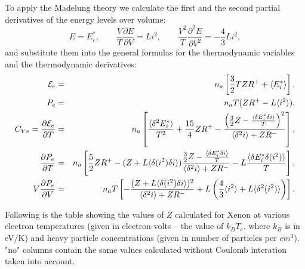 To apply the Madelung theory we calculate the first and the second partial derivatives
of the energy levels over volume:
\begin{equation}
E = E^*_i, \qquad
\frac{V}{T} \frac{\partial E}{\partial V} = L i^2, \qquad
\frac{V^2}{T} \frac{\partial^2 E}{\partial V^2} = -\frac43 L i^2,
\end{equation}
and substitute them into the general formulas for the thermodynamic variables
and the thermodynamic derivatives:
\begin{eqnarray}
\label{madE}
{\cal E}_e &=& n_a\left[ \frac32 T Z R^+ + \langle E^*_i \rangle \right], \\
\label{madP}
P_e &=& n_aT ( ZR^+ - L \langle i^2 \rangle ), \\
\label{madCv}
C_{Ve} = \frac{\partial {\cal E}_e}{\partial T} &=& n_a\left[\frac{\langle\delta^2E^*_i\rangle}{T^2}+\frac{15}4ZR^+
-\frac{\left(\frac32Z-\frac{\langle\delta E^*_i\delta i\rangle}T\right)^2}{\langle\delta^2i\rangle+ZR^-}\right], \\
\label{madPT}
\frac {\partial P_e}{\partial T} &=&
n_a\left[
	\frac52 Z R^+ -
	(Z+L \langle \delta(i^2) \delta i \rangle)
		\frac{\frac32Z-\frac{\langle\delta E^*_i\delta i\rangle}T}{\langle\delta^2i\rangle+ZR^-} -
	L \frac{\langle \delta E^*_i \delta(i^2) \rangle}T
\right], \\
\label{madCompr}
V\frac{\partial P_e}{\partial V} &=&
n_a T \left[ -\frac{(Z + L \langle \delta(i^2) \delta i \rangle)^2}{\langle \delta^2 i \rangle + ZR^-} +
L \left( \frac43 \langle i^2 \rangle + L \langle \delta^2(i^2) \rangle \right) \right].
\end{eqnarray}

Following is the table showing the values of $Z$ calculated for Xenon
at various electron temperatures
(given in electron-volts -- the value of $k_{B}T_{e}$, where $k_{B}$
is in eV/K) and heavy particle concentrations (given in number of
particles per $cm^{3}$). "no" columns contain the same values
calculated without Coulomb interation taken into account.

\begin{center}

\par\end{center}

